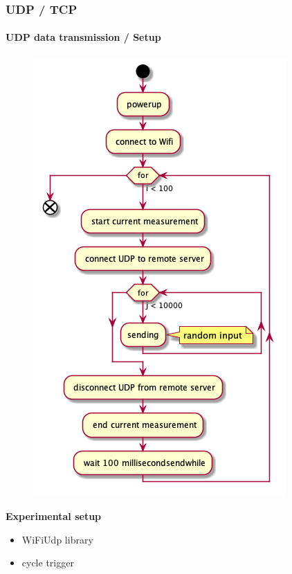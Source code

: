 \begin{frame}
	\frametitle{UDP / TCP}
	\framesubtitle{UDP data transmission / Setup}
	\begin{minipage}[c]{0.60 \textwidth}
		\begin{figure}[H]
			\centering
			\includegraphics[width = 0.6 \linewidth]{fig/UDP_TCP/udp_uml.png}
		\end{figure}
	\end{minipage}
	\begin{minipage}[t]{0.30 \textwidth}
		\vspace{-100pt}
		\textbf{Experimental setup}
		\begin{itemize}
			\item WiFiUdp library
			\item cycle trigger
		\end{itemize}
		        \end{minipage}
	\end{frame}

